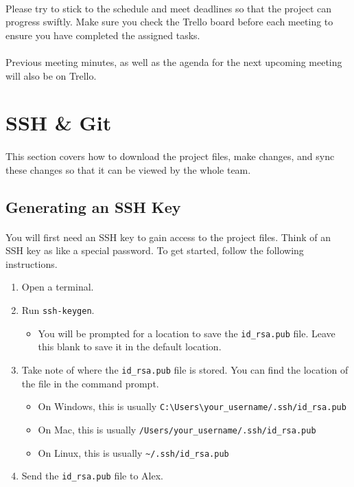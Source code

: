 \documentclass[11pt]{article}
\begin{document}
\paragraph{}
Please try to stick to the schedule and meet deadlines so that the project can progress swiftly. Make sure you check the Trello board before each meeting to ensure you have completed the assigned tasks.
\paragraph{}
Previous meeting minutes, as well as the agenda for the next upcoming meeting will also be on Trello.
\section{SSH \& Git}
\paragraph{}
This section covers how to download the project files, make changes, and sync these changes so that it can be viewed by the whole team.
\subsection{Generating an SSH Key}
\paragraph{}
You will first need an SSH key to gain access to the project files. Think of an SSH key as like a special password. To get started, follow the following instructions.
\begin{enumerate}
\item Open a terminal.
\item Run \lstinline{ssh-keygen}.
\begin{itemize}
\item You will be prompted for a location to save the \lstinline{id_rsa.pub} file. Leave this blank to save it in the default location.
\end{itemize}
\item Take note of where the \lstinline{id_rsa.pub} file is stored. You can find the location of the file in the command prompt.
\begin{itemize}
\item On Windows, this is usually \lstinline{C:\Users\your_username/.ssh/id_rsa.pub}
\item On Mac, this is usually \lstinline{/Users/your_username/.ssh/id_rsa.pub}
\item On Linux, this is usually \lstinline{~/.ssh/id_rsa.pub}
\end{itemize}
\item Send the \lstinline{id_rsa.pub} file to Alex.
\end{enumerate}
\end{document}
